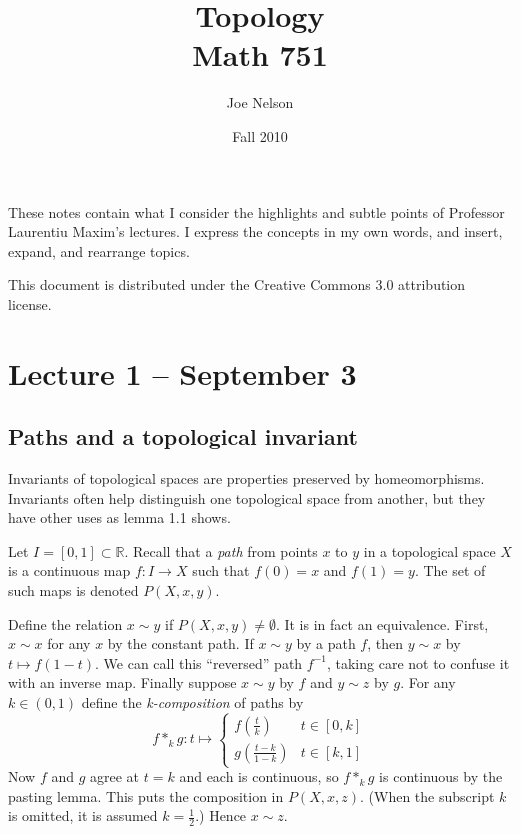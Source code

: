\documentclass[letterpaper]{article}
\begin{document}
\title{Topology\\
Math 751}
\author{Joe Nelson}
\date{Fall 2010}
\maketitle

These notes contain what I consider the highlights and subtle points
of Professor Laurentiu Maxim's lectures. I express the concepts in
my own words, and insert, expand, and rearrange topics.

This document is distributed under the Creative Commons 3.0 attribution
license.

\section{Lecture 1 -- September 3}

\subsection{Paths and a topological invariant}

Invariants of topological spaces are properties preserved by
homeomorphisms. Invariants often help distinguish one topological
space from another, but they have other uses as lemma 1.1 shows.

Let $I = [0, 1] \subset \mathbb{R}$. Recall that a \emph{path} from
points $x$ to $y$ in a topological space $X$ is a continuous map
$f \colon I \rightarrow X$ such that $f(0) = x$ and $f(1) = y$. The
set of such maps is denoted $P(X, x, y)$.

Define the relation $x \sim y$ if $P(X, x, y) \ne \emptyset$. It
is in fact an equivalence. First, $x \sim x$ for any $x$ by the
constant path. If $x \sim y$ by a path $f$, then $y \sim x$ by $t
\mapsto f(1-t)$. We can call this ``reversed'' path $f^{-1}$, taking
care not to confuse it with an inverse map. Finally suppose $x \sim
y$ by $f$ and $y \sim z$ by $g$. For any $k \in (0, 1)$ define the
\emph{k-composition} of paths by
\[ f \ast_k g \colon t \mapsto
   \left\{
     \begin{array}{lr}
       f(\frac{t}{k}) & t \in [0, k]\\
       g(\frac{t-k}{1-k}) & t \in [k, 1]
     \end{array}
   \right.
\]
Now $f$ and $g$ agree at $t = k$ and each is continuous, so $f
\ast_k g$ is continuous by the pasting lemma. This puts the composition
in $P(X, x, z)$. (When the subscript $k$ is omitted, it is assumed
$k = \frac{1}{2}$.) Hence $x \sim z$.
\end{document}
